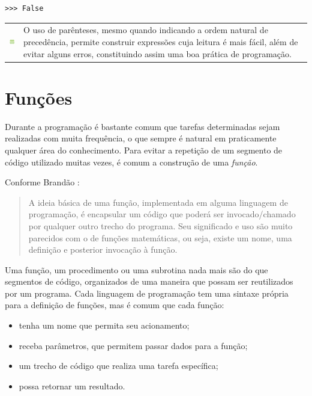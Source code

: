 \documentclass[
]{book}
\providecommand{\tightlist}{%
  \setlength{\itemsep}{0pt}\setlength{\parskip}{0pt}}
\begin{document}
\begin{verbatim}
>>> False
\end{verbatim}

\begin{longtable}[]{@{}
  >{\centering\arraybackslash}p{}
  >{\raggedright\arraybackslash}p{}@{}}
\toprule
& \\
\midrule
\endhead
\includegraphics{images/application-green.png} & O uso de parênteses, mesmo quando indicando a ordem natural de precedência, permite construir expressões cuja leitura é mais fácil, além de evitar alguns erros, constituindo assim uma boa prática de programação. \\
\bottomrule
\end{longtable}

\hypertarget{comput-funcao}{%
\section{Funções}\label{comput-funcao}}

Durante a programação é bastante comum que tarefas determinadas sejam realizadas com muita frequência, o que sempre é natural em praticamente qualquer área do conhecimento. Para evitar a repetição de um segmento de código utilizado muitas vezes, é comum a construção de uma \emph{função}.

Conforme Brandão \citep{bra2021}:

\begin{quote}
A ideia básica de uma função, implementada em alguma linguagem de programação, é encapsular um código que poderá ser invocado/chamado por qualquer outro trecho do programa. Seu significado e uso são muito parecidos com o de funções matemáticas, ou seja, existe um nome, uma definição e posterior invocação à função.
\end{quote}

Uma função, um procedimento ou uma subrotina nada mais são do que segmentos de código, organizados de uma maneira que possam ser reutilizados por um programa. Cada linguagem de programação tem uma sintaxe própria para a definição de funções, mas é comum que cada função:

\begin{itemize}
\tightlist
\item
  tenha um nome que permita seu acionamento;
\item
  receba parâmetros, que permitem passar dados para a função;
\item
  um trecho de código que realiza uma tarefa específica;
\item
  possa retornar um resultado.
\end{itemize}
\end{document}
